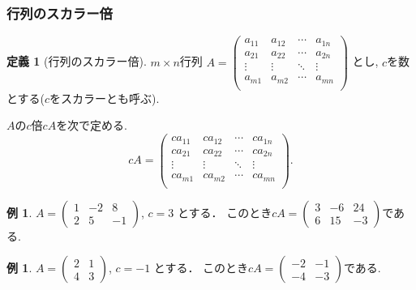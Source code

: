 \documentclass[dvipdfmx,a4paper,11pt]{article}
\theoremstyle{definition}
\newtheorem{dfn}[thm]{定義}
\newtheorem{exa}[thm]{例}
\begin{document}
 \subsubsection{行列のスカラー倍}
 
  \begin{tcolorbox}[
    colback = white,
    colframe = green!35!black,
    fonttitle = \bfseries,
    breakable = true]
    \begin{dfn}[行列のスカラー倍]
    \text{}
    
 $m \times n$行列
 $
A=\begin{pmatrix}
a_{11}& a_{12} & \cdots &a_{1n} \\
a_{21}& a_{22} & \cdots &a_{2n} \\
\vdots& \vdots	&	\ddots   &	\vdots \\
a_{m1}& a_{m2} & \cdots &a_{mn} \\
\end{pmatrix}$
とし, $c$を数とする($c$をスカラーとも呼ぶ).

$A$の$c$倍$cA$を次で定める.
$$
cA=
\begin{pmatrix}
ca_{11}&c a_{12} & \cdots &ca_{1n} \\
ca_{21}& ca_{22} & \cdots &ca_{2n} \\
\vdots& \vdots	&	\ddots   &	\vdots \\
ca_{m1}& ca_{m2} & \cdots &ca_{mn} \\
\end{pmatrix}.
$$
  \end{dfn}
 \end{tcolorbox}

\begin{exa}
 $A = 
 \begin{pmatrix}
 1 &-2&8 \\
 2&5&-1
 \end{pmatrix}
 $,
 $
 c =3
 $
 とする．
 このとき$
 cA =
 \begin{pmatrix}
 3 &-6&24 \\
 6&15&-3
 \end{pmatrix}
 $である.
 \end{exa}
 \begin{exa}
 $A = 
 \begin{pmatrix}
 2&1 \\
 4&3
 \end{pmatrix}
 $, 
 $
 c =-1
 $
 とする．
 このとき$
 cA =
 \begin{pmatrix}
 -2 &-1 \\
-4&-3
 \end{pmatrix}
 $である.
 \end{exa}
 
\end{document}
